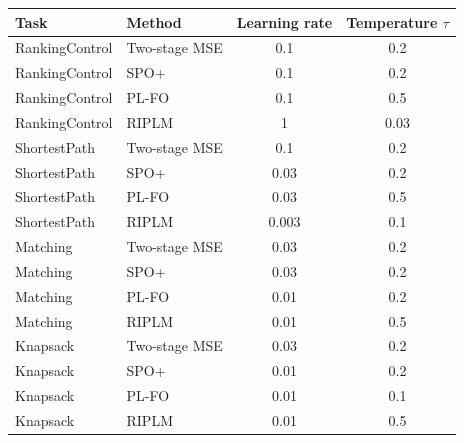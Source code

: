 \begin{tabular}{llcc}
\toprule
Task & Method & Learning rate & Temperature $\tau$ \\
\midrule
RankingControl & Two-stage MSE & 0.1 & 0.2 \\
RankingControl & SPO+ & 0.1 & 0.2 \\
RankingControl & PL-FO & 0.1 & 0.5 \\
RankingControl & RIPLM & 1 & 0.03 \\
ShortestPath & Two-stage MSE & 0.1 & 0.2 \\
ShortestPath & SPO+ & 0.03 & 0.2 \\
ShortestPath & PL-FO & 0.03 & 0.5 \\
ShortestPath & RIPLM & 0.003 & 0.1 \\
Matching & Two-stage MSE & 0.03 & 0.2 \\
Matching & SPO+ & 0.03 & 0.2 \\
Matching & PL-FO & 0.01 & 0.2 \\
Matching & RIPLM & 0.01 & 0.5 \\
Knapsack & Two-stage MSE & 0.03 & 0.2 \\
Knapsack & SPO+ & 0.01 & 0.2 \\
Knapsack & PL-FO & 0.01 & 0.1 \\
Knapsack & RIPLM & 0.01 & 0.5 \\
\bottomrule
\end{tabular}